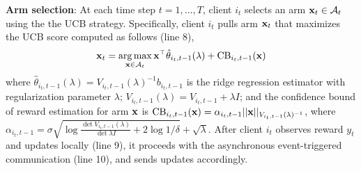 \noindent \textbf{Arm selection}:
At each time step $t=1,\dots,T$, 
client $i_{t}$ selects an arm $\mathbf{x}_{t} \in \mathcal{A}_{t}$ using the the UCB strategy. Specifically, client $i_{t}$ pulls arm $\mathbf{x}_{t}$ that maximizes the UCB score computed as follows (line 8),
\begin{equation}\label{eq:UCB}
    \mathbf{x}_{t}=\operatorname*{arg\,max}_{\mathbf{x} \in \mathcal{A}_{t}}{\mathbf{x}^{\top}\hat{\theta}_{i_{t},t-1}(\lambda)+\text{CB}_{i_{t},t-1}(\mathbf{x})}
\end{equation}
where $\hat{\theta}_{i_{t},t-1}(\lambda)= V_{i_{t},t-1}(\lambda)^{-1}b_{i_{t},t-1}$ is the ridge regression estimator with regularization parameter $\lambda$; $V_{i_{t},t-1}(\lambda)=V_{i_{t},t-1}+\lambda I$; and the confidence bound of reward estimation for arm $\mathbf{x}$ is $\text{CB}_{i_{t},t-1}(\mathbf{x})=\alpha_{i_{t},t-1}||\mathbf{x}||_{V_{i_{t},t-1}(\lambda)^{-1}}$, where 
$\alpha_{i_{t},t-1}=\sigma \sqrt{\log{\frac{\det{V_{i_{t},t-1}(\lambda) }}{\det{\lambda I}}}+2\log{1/\delta}}+\sqrt{\lambda}$.
After client $i_{t}$ observes reward $y_{t}$ and updates locally (line 9), it proceeds with the asynchronous event-triggered communication (line 10), and sends updates accordingly.

